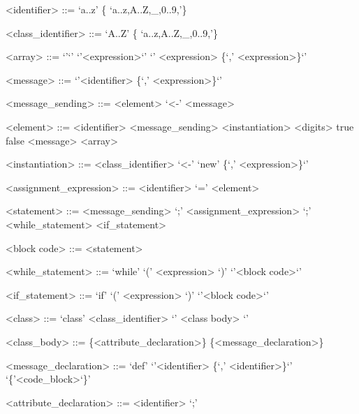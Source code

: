\documentclass{eplDoc}
\begin{document}
\maketitle
\newpage

\begin{grammar}
<identifier> ::= `a..z' \{ `a..z,A..Z,\_,0..9,'\} 

<class\_identifier> ::= `A..Z' \{ `a..z,A..Z,\_,0..9,'\} 

<array> ::= `{'`}' \alt `{'<expression>`}' \alt `{' <expression> \{`,' <expression>\}`}'

<message> ::= `{'<identifier> \{`,' <expression>\}`}'

<message\_sending> ::= <element> `<-' <message>

<element> ::= <identifier> 
\alt<message\_sending>
\alt<instantiation>
\alt<digits>
\alt true \alt false
\alt <message>
\alt <array>


<instantiation> ::= <class\_identifier> `<-' `{new' \{`,' <expression>\}`}'


<assignment\_expression> ::= <identifier> `=' <element>

<statement> ::= <message_sending> `;'
\alt <assignment\_expression>
 `;'
\alt <while\_statement>
\alt <if\_statement>

<block code> ::= { <statement> }

<while\_statement> ::= `while' `(' <expression> `)'  `{'<block code>`}'

<if\_statement> ::= `if' `(' <expression> `)'  `{'<block code>`}'




<class> ::= `class' <class\_identifier> `{' <class body> `}'

<class\_body> ::= \{<attribute\_declaration>\} \{<message\_declaration>\}

<message\_declaration> ::= `def'  `{'<identifier> \{`,' <identifier>\}`}' `\{'<code\_block>`\}'

<attribute\_declaration> ::= <identifier> `;'









\end{grammar}
\end{document}

